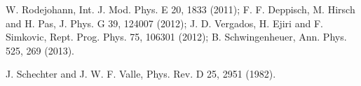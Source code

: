 \begin{titlepage}
\begin{thebibliography}{99}
 W. Rodejohann, Int. J. Mod. Phys. E 20, 1833 (2011); F. F. Deppisch, M. Hirsch and H. Pas, J. Phys. G 39, 124007 (2012); J. D. Vergados, H. Ejiri and F. Simkovic, Rept. Prog. Phys. 75, 106301 (2012); B. Schwingenheuer, Ann. Phys. 525, 269 (2013).

  J. Schechter and J. W. F. Valle, Phys. Rev. D 25, 2951 (1982).


\end{thebibliography}
\end{titlepage}
\begin{titlepage}
\author{%
\\
    Gonz\'alez Hernando\\
    Universidad Surcolombiana \\
    \texttt{\footnotesize hergosi@usco.edu.co}\vspace{20pt} \\
    Segovia Francis \\
   Universidad Surcolombiana \\
   \texttt{\footnotesize osmin.ferrer@usco.edu.co }\vspace{20pt} \\
   Ferrer Osmin\\
    Universidad Surcolombiana\\
    \texttt{\footnotesize francis.segovia@usco.edu.co}\\
         }
 \newcommand{\RE}{\mathrm{Re}}
 \newcommand{\IM}{\mathrm{Im}}
 \newcommand{\eps}{\varepsilon}
 \newcommand{\To}{\longrightarrow}
 \newcommand{\h}{\mathfrak{H}}
\newcommand{\Ho}{\mathcal{H}}
 \newcommand{\s}{\mathcal{S}}
 \newcommand{\A}{\mathrm{A}}
 \newcommand{\conv}{\xymatrix {*+<0.025cm>^[o][F-]{\star}}}
 \newcommand{\K}{\mathcal{K}}
 \newcommand{\J}{\mathcal{J}}
 \newcommand{\V}{\mathcal{V}}
  \newcommand{\B}{\mathcal{B}}
 \newcommand{\M}{\mathcal{M}}
 \newcommand{\E}{\mathbf{E}}
 \newcommand{\W}{\mathcal{W}}
 \newcommand{\I}{\mathcal{I}}
 \newcommand{\N}{\mathbb{N}}
\newcommand{\arctanh}{\textrm{arctanh}}
\newcommand{\arcsinh}{\textrm{arcsinh}}
\newcommand{\arccosh}{\textrm{arccosh}}
\newcommand{\sech}{\textrm{sech}}
 \newcommand{\je}{J_{\ell_{2}}}
 \newcommand{\WIA} {\widetilde{a}}
 \newcommand{\X}{\mathcal{X}}
  \newcommand{\Disk}{\mathbb{D}}
 \newcommand{\BOP}{\mathbf{B}}
 \newcommand{\BBd}{\mathcal{B}\left(\Bergman\left(\Disk\right)\right)}
  \newcommand{\BBp}{\mathcal{B}\left(\Bergman\left(\Pi\right)\right)}

\end{titlepage}
